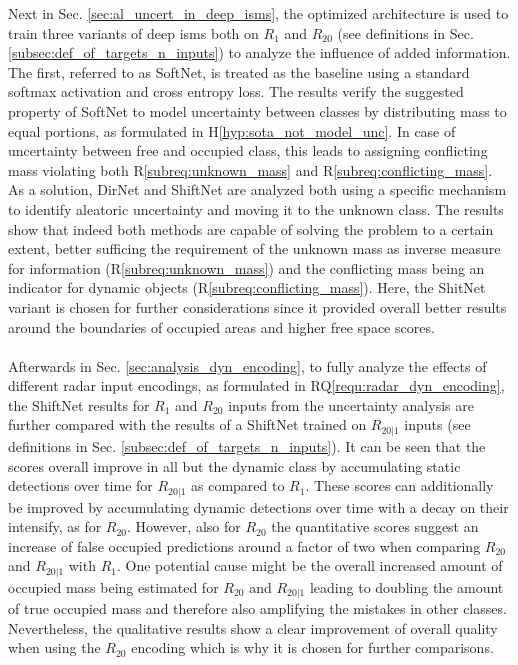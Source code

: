Next in Sec. \ref{sec:al_uncert_in_deep_isms}, the optimized architecture is used to train three variants of deep \gls{ism}s both on $R_1$ and $R_{20}$ (see definitions in Sec. \ref{subsec:def_of_targets_n_inputs}) to analyze the influence of added information. The first, referred to as SoftNet, is treated as the baseline using a standard softmax activation and cross entropy loss. The results verify the suggested property of SoftNet to model uncertainty between classes by distributing mass to equal portions, as formulated in H\ref{hyp:sota_not_model_unc}. In case of uncertainty between free and occupied class, this leads to assigning conflicting mass violating both R\ref{subreq:unknown_mass} and R\ref{subreq:conflicting_mass}. As a solution, DirNet and ShiftNet are analyzed both using a specific mechanism to identify aleatoric uncertainty and moving it to the unknown class. The results show that indeed both methods are capable of solving the problem to a certain extent, better sufficing the requirement of the unknown mass as inverse measure for information (R\ref{subreq:unknown_mass}) and the conflicting mass being an indicator for dynamic objects (R\ref{subreq:conflicting_mass}). Here, the ShitNet variant is chosen for further considerations since it provided overall better results around the boundaries of occupied areas and higher free space scores.
\\\\
Afterwards in Sec. \ref{sec:analysis_dyn_encoding}, to fully analyze the effects of different radar input encodings, as formulated in RQ\ref{requ:radar_dyn_encoding}, the ShiftNet results for $R_1$ and $R_{20}$ inputs from the uncertainty analysis are further compared with the results of a ShiftNet trained on $R_{20|1}$ inputs (see definitions in Sec. \ref{subsec:def_of_targets_n_inputs}). It can be seen that the scores overall improve in all but the dynamic class by accumulating static detections over time for $R_{20|1}$ as compared to $R_1$. These scores can additionally be improved by accumulating dynamic detections over time with a decay on their intensify, as for $R_{20}$. However, also for $R_{20}$ the quantitative scores suggest an increase of false occupied predictions around a factor of two when comparing $R_{20}$ and $R_{20|1}$ with $R_1$. One potential cause might be the overall increased amount of occupied mass being estimated for $R_{20}$ and $R_{20|1}$ leading to doubling the amount of true occupied mass and therefore also amplifying the mistakes in other classes. Nevertheless, the qualitative results show a clear improvement of overall quality when using the $R_{20}$ encoding which is why it is chosen for further comparisons.
